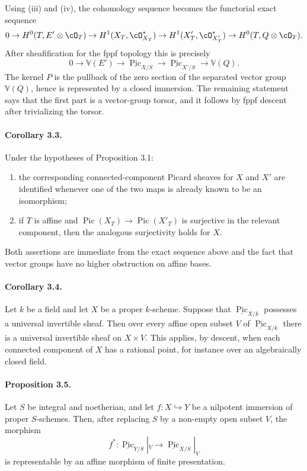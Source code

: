 \documentclass[11pt]{article}
\theoremstyle{plain}
\theoremstyle{definition}
\theoremstyle{remark}
\DeclareMathOperator{\Pic}{Pic}
\begin{document}
Using (iii) and (iv), the cohomology sequence becomes the functorial exact sequence
\[
0\to H^0(T,E'\otimes\cO_T)\to
H^1(X_T,\cO_{X_T}^*)\to
H^1(X'_T,\cO_{X'_T}^*)\to
H^0(T,Q\otimes\cO_T).
\]
After sheafification for the fppf topology this is precisely
\[
0\to\mathbb V(E')\to\underline{\Pic}_{X/S}\to
\underline{\Pic}_{X'/S}\to\mathbb V(Q).
\]
The kernel $P$ is the pullback of the zero section of the separated vector group $\mathbb V(Q)$, hence is represented by a closed immersion. The remaining statement says that the first part is a vector-group torsor, and it follows by fppf descent after trivializing the torsor.

\paragraph{Corollary 3.3.}
Under the hypotheses of Proposition 3.1:
\begin{enumerate}[label=\roman*)]
\item the corresponding connected-component Picard sheaves for $X$ and $X'$ are identified whenever one of the two maps is already known to be an isomorphism;
\item if $T$ is affine and $\Pic(X_T)\to \Pic(X'_T)$ is surjective in the relevant component, then the analogous surjectivity holds for $X$.
\end{enumerate}
Both assertions are immediate from the exact sequence above and the fact that vector groups have no higher obstruction on affine bases.

\paragraph{Corollary 3.4.}
Let $k$ be a field and let $X$ be a proper $k$-scheme. Suppose that $\underline{\Pic}_{X/k}$ possesses a universal invertible sheaf. Then over every affine open subset $V$ of $\underline{\Pic}_{X/k}$ there is a universal invertible sheaf on $X\times V$. This applies, by descent, when each connected component of $X$ has a rational point, for instance over an algebraically closed field.

\paragraph{Proposition 3.5.}
Let $S$ be integral and noetherian, and let $f:X\hookrightarrow Y$ be a nilpotent immersion of proper $S$-schemes. Then, after replacing $S$ by a non-empty open subset $V$, the morphism
\[
f^*:\underline{\Pic}_{Y/S}|_V\to\underline{\Pic}_{X/S}|_V
\]
is representable by an affine morphism of finite presentation.
\end{document}
